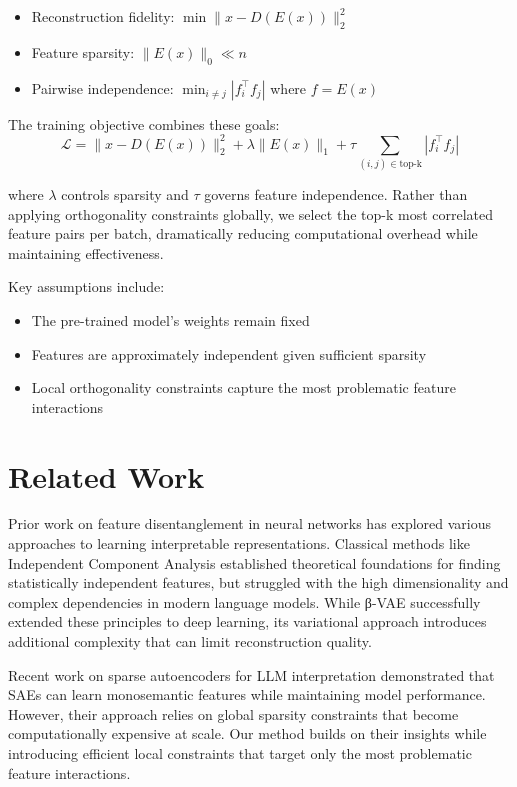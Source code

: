 \documentclass{article} %
\begin{document}
\begin{itemize}
    \item Reconstruction fidelity: $\min \|x - D(E(x))\|_2^2$
    \item Feature sparsity: $\|E(x)\|_0 \ll n$
    \item Pairwise independence: $\min_{i \neq j} |f_i^\top f_j|$ where $f = E(x)$
\end{itemize}

The training objective combines these goals:
\begin{equation}
    \mathcal{L} = \|x - D(E(x))\|_2^2 + \lambda\|E(x)\|_1 + \tau\sum_{(i,j) \in \text{top-k}} |f_i^\top f_j|
\end{equation}

where $\lambda$ controls sparsity and $\tau$ governs feature independence. Rather than applying orthogonality constraints globally, we select the top-k most correlated feature pairs per batch, dramatically reducing computational overhead while maintaining effectiveness.

Key assumptions include:
\begin{itemize}
    \item The pre-trained model's weights remain fixed
    \item Features are approximately independent given sufficient sparsity
    \item Local orthogonality constraints capture the most problematic feature interactions
\end{itemize}

\section{Related Work}
\label{sec:related}

Prior work on feature disentanglement in neural networks has explored various approaches to learning interpretable representations. Classical methods like Independent Component Analysis \cite{Hughes2000AUI} established theoretical foundations for finding statistically independent features, but struggled with the high dimensionality and complex dependencies in modern language models. While β-VAE \cite{Burgess2018UnderstandingDI} successfully extended these principles to deep learning, its variational approach introduces additional complexity that can limit reconstruction quality.

Recent work on sparse autoencoders for LLM interpretation \cite{Cunningham2023SparseAF} demonstrated that SAEs can learn monosemantic features while maintaining model performance. However, their approach relies on global sparsity constraints that become computationally expensive at scale. Our method builds on their insights while introducing efficient local constraints that target only the most problematic feature interactions.
\end{document}
